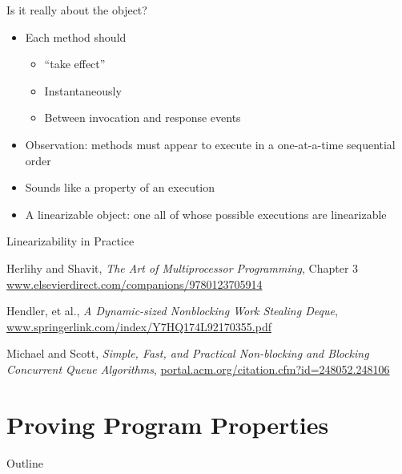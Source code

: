 \begin{frame}{Is it really about the object?}
  \begin{itemize}
  \item Each method should
    \begin{itemize}
    \item ``take effect''
    \item Instantaneously
    \item Between invocation and response events
    \end{itemize}
  \item Observation: methods must appear to execute in a one-at-a-time
    sequential order
  \item Sounds like a property of an execution
  \item A linearizable object: one all of whose possible executions
    are linearizable
  \end{itemize}
\end{frame}

\begin{frame}{Linearizability in Practice}
  \begin{thebibliography}{10}
    \beamertemplatearticlebibitems
    
    Herlihy and Shavit, {\em The Art of Multiprocessor Programming}, Chapter 3
    \url{www.elsevierdirect.com/companions/9780123705914}

    Hendler, et al., {\em A Dynamic-sized Nonblocking Work Stealing Deque},
    \url{www.springerlink.com/index/Y7HQ174L92170355.pdf}

    Michael and Scott, {\em Simple, Fast, and Practical Non-blocking and Blocking Concurrent Queue Algorithms},
    \url{portal.acm.org/citation.cfm?id=248052.248106}
  \end{thebibliography}  
\end{frame}


\section{Proving Program Properties}

\begin{frame}{Outline}
  \tableofcontents[current]
\end{frame}

